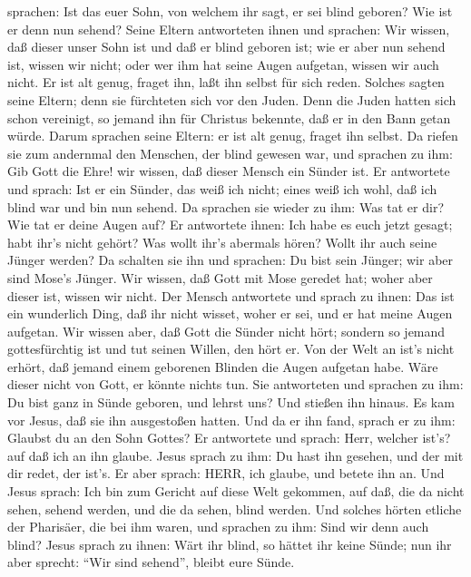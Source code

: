 sprachen: Ist das euer Sohn, von welchem ihr sagt, er sei blind geboren?
Wie ist er denn nun sehend?  Seine Eltern antworteten ihnen
und sprachen: Wir wissen, daß dieser unser Sohn ist und daß er blind
geboren ist;  wie er aber nun sehend ist, wissen wir nicht;
oder wer ihm hat seine Augen aufgetan, wissen wir auch nicht. Er ist alt
genug, fraget ihn, laßt ihn selbst für sich reden.  Solches
sagten seine Eltern; denn sie fürchteten sich vor den Juden. Denn die
Juden hatten sich schon vereinigt, so jemand ihn für Christus bekennte,
daß er in den Bann getan würde.  Darum sprachen seine
Eltern: er ist alt genug, fraget ihn selbst.  Da riefen sie
zum andernmal den Menschen, der blind gewesen war, und sprachen zu ihm:
Gib Gott die Ehre! wir wissen, daß dieser Mensch ein Sünder ist.
 Er antwortete und sprach: Ist er ein Sünder, das weiß ich
nicht; eines weiß ich wohl, daß ich blind war und bin nun sehend.
 Da sprachen sie wieder zu ihm: Was tat er dir? Wie tat er
deine Augen auf?  Er antwortete ihnen: Ich habe es euch
jetzt gesagt; habt ihr's nicht gehört? Was wollt ihr's abermals hören?
Wollt ihr auch seine Jünger werden?  Da schalten sie ihn
und sprachen: Du bist sein Jünger; wir aber sind Mose's Jünger.
 Wir wissen, daß Gott mit Mose geredet hat; woher aber
dieser ist, wissen wir nicht.  Der Mensch antwortete und
sprach zu ihnen: Das ist ein wunderlich Ding, daß ihr nicht wisset,
woher er sei, und er hat meine Augen aufgetan.  Wir wissen
aber, daß Gott die Sünder nicht hört; sondern so jemand gottesfürchtig
ist und tut seinen Willen, den hört er.  Von der Welt an
ist's nicht erhört, daß jemand einem geborenen Blinden die Augen
aufgetan habe.  Wäre dieser nicht von Gott, er könnte
nichts tun.  Sie antworteten und sprachen zu ihm: Du bist
ganz in Sünde geboren, und lehrst uns? Und stießen ihn hinaus.
 Es kam vor Jesus, daß sie ihn ausgestoßen hatten. Und da
er ihn fand, sprach er zu ihm: Glaubst du an den Sohn Gottes?
 Er antwortete und sprach: Herr, welcher ist's? auf daß ich
an ihn glaube.  Jesus sprach zu ihm: Du hast ihn gesehen,
und der mit dir redet, der ist's.  Er aber sprach: HERR,
ich glaube, und betete ihn an.  Und Jesus sprach: Ich bin
zum Gericht auf diese Welt gekommen, auf daß, die da nicht sehen, sehend
werden, und die da sehen, blind werden.  Und solches hörten
etliche der Pharisäer, die bei ihm waren, und sprachen zu ihm: Sind wir
denn auch blind?  Jesus sprach zu ihnen: Wärt ihr blind, so
hättet ihr keine Sünde; nun ihr aber sprecht: ``Wir sind sehend'',
bleibt eure Sünde.

